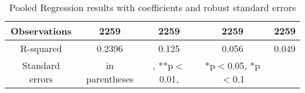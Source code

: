 \begin{table}[ht]
\begin{tabular}{|ccccc|}
Observations & 2259 & 2259 & 2259 & 2259 \\
\hline
R-squared &0.2396 & 0.125 & 0.056 & 0.049 \\
\hline
\footnotesize Standard errors& \footnotesize in parentheses&, \footnotesize***p$<$0.01, &\footnotesize **p$<$0.05, *p$<$0.1\\
\end{tabular}
\caption{Pooled Regression results with coefficients and robust standard errors}
\label{Pooled Regression results with coefficients and robust standard errors}
\end{table}
